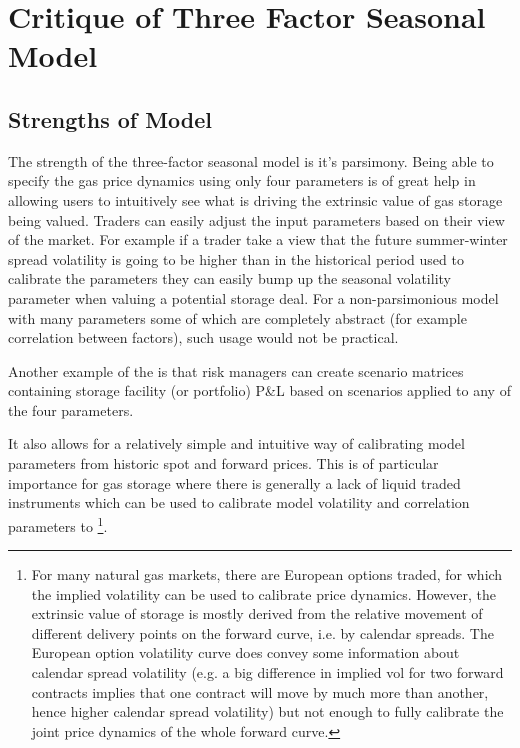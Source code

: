\documentclass{article}
\begin{document}
\section{Critique of Three Factor Seasonal Model}
\subsection{Strengths of Model}

The strength of the three-factor seasonal model is it's parsimony. 
Being able to specify the gas price dynamics using only four parameters is of great help
in allowing users to intuitively see what is driving the extrinsic value of gas storage
being valued. Traders can easily adjust the input
parameters based on their view of the market. For example if a trader take a view that 
the future summer-winter spread volatility is going to be higher than in the historical
period used to calibrate the parameters they can easily bump up the seasonal volatility
parameter when valuing a potential storage deal. For a non-parsimonious model with many parameters
some of which are completely abstract (for example correlation between factors), such
usage would not be practical.

Another example of the is that risk managers can 
create scenario matrices containing storage facility (or portfolio) P\&L based on scenarios 
applied to any of the four parameters. 


It also allows for a relatively simple and intuitive way of calibrating
model parameters from historic spot and forward prices. This is of particular importance
for gas storage where there is generally a lack of liquid traded instruments which can be used
to calibrate model volatility and correlation parameters to
\footnote[1]{For many natural gas markets, there are European options traded, for which the
implied volatility can be used to calibrate price dynamics. However, the extrinsic value
of storage is mostly derived from the relative movement of different delivery points
on the forward curve, i.e. by calendar spreads. The European option volatility curve
does convey some information about calendar spread volatility (e.g. a big difference
in implied vol for two forward contracts implies that one contract will move by much
more than another, hence higher calendar spread volatility) but not enough to fully 
calibrate the joint price dynamics of the whole forward curve.}.
\end{document}
